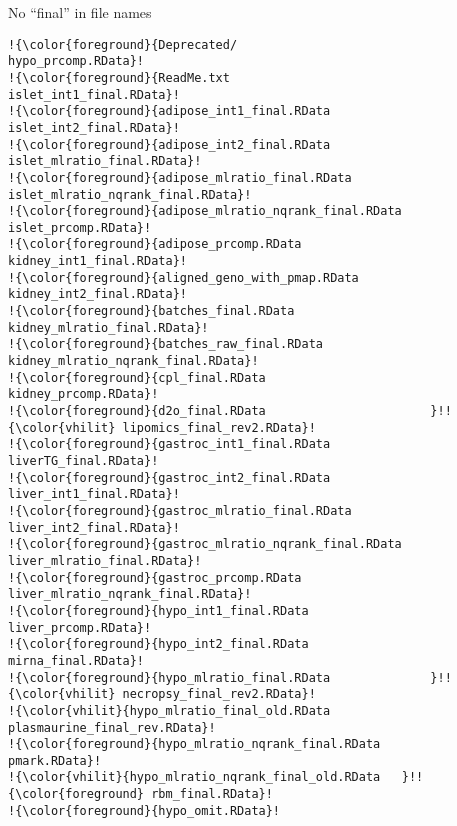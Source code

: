 \documentclass[aspectratio=169,12pt,t]{beamer}
\begin{document}
\begin{frame}[fragile,c]{No ``{\hilit final}'' in file names}


\begin{center}
\begin{minipage}[c]{9.5cm}
\begin{semiverbatim}
\lstset{basicstyle=\tiny}
\begin{lstlisting}[escapechar=!,linewidth=9.5cm]
!{\color{foreground}{Deprecated/                            hypo_prcomp.RData}!
!{\color{foreground}{ReadMe.txt                             islet_int1_final.RData}!
!{\color{foreground}{adipose_int1_final.RData               islet_int2_final.RData}!
!{\color{foreground}{adipose_int2_final.RData               islet_mlratio_final.RData}!
!{\color{foreground}{adipose_mlratio_final.RData            islet_mlratio_nqrank_final.RData}!
!{\color{foreground}{adipose_mlratio_nqrank_final.RData     islet_prcomp.RData}!
!{\color{foreground}{adipose_prcomp.RData                   kidney_int1_final.RData}!
!{\color{foreground}{aligned_geno_with_pmap.RData           kidney_int2_final.RData}!
!{\color{foreground}{batches_final.RData                    kidney_mlratio_final.RData}!
!{\color{foreground}{batches_raw_final.RData                kidney_mlratio_nqrank_final.RData}!
!{\color{foreground}{cpl_final.RData                        kidney_prcomp.RData}!
!{\color{foreground}{d2o_final.RData                       }!!{\color{vhilit} lipomics_final_rev2.RData}!
!{\color{foreground}{gastroc_int1_final.RData               liverTG_final.RData}!
!{\color{foreground}{gastroc_int2_final.RData               liver_int1_final.RData}!
!{\color{foreground}{gastroc_mlratio_final.RData            liver_int2_final.RData}!
!{\color{foreground}{gastroc_mlratio_nqrank_final.RData     liver_mlratio_final.RData}!
!{\color{foreground}{gastroc_prcomp.RData                   liver_mlratio_nqrank_final.RData}!
!{\color{foreground}{hypo_int1_final.RData                  liver_prcomp.RData}!
!{\color{foreground}{hypo_int2_final.RData                  mirna_final.RData}!
!{\color{foreground}{hypo_mlratio_final.RData              }!!{\color{vhilit} necropsy_final_rev2.RData}!
!{\color{vhilit}{hypo_mlratio_final_old.RData           plasmaurine_final_rev.RData}!
!{\color{foreground}{hypo_mlratio_nqrank_final.RData        pmark.RData}!
!{\color{vhilit}{hypo_mlratio_nqrank_final_old.RData   }!!{\color{foreground} rbm_final.RData}!
!{\color{foreground}{hypo_omit.RData}!
\end{lstlisting}
\end{semiverbatim}
\end{minipage}
\end{center}



\end{frame}
\end{document}
